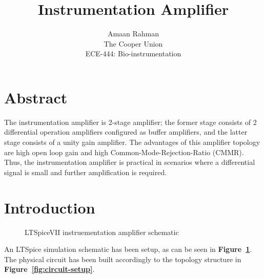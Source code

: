 \documentclass{article}
\title{Instrumentation Amplifier}
\author{Amaan Rahman \\
The Cooper Union \\
ECE-444: Bio-instrumentation}
\begin{document}
\maketitle
\section{Abstract}
The instrumentation amplifier is 2-stage amplifier; the former stage consists of 2 differential operation amplifiers configured as buffer amplifiers, and the latter stage consists of a unity gain amplifier. The advantages of this amplifier topology are high open loop gain and high Common-Mode-Rejection-Ratio (CMMR). Thus, the instrumentation amplifier is practical in scenarios where a differential signal is small and further amplification is required. 

\section{Introduction}
\begin{figure}[h!]
    \begin{center}
    \end{center}
    \caption{LTSpiceVII instruementation amplifier schematic}
    \label{fig:spice-schematic}
\end{figure}

An LTSpice simulation schematic has been setup, as can be seen in \textbf{Figure~\ref{fig:spice-schematic}}. The physical circuit has been built accordingly to the topology structure in \textbf{Figure~\ref{fig:circuit-setup}}. \\
\end{document}
